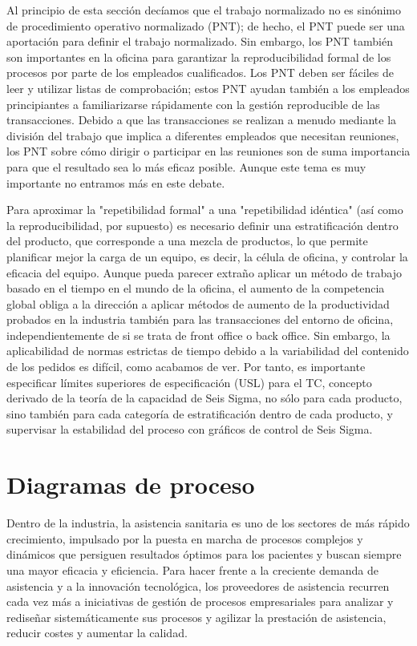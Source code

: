 Al principio de esta sección decíamos que el trabajo normalizado no es sinónimo de procedimiento operativo normalizado (PNT); de hecho, el PNT puede ser una aportación para definir el trabajo normalizado.
Sin embargo, los PNT también son importantes en la oficina para garantizar la reproducibilidad formal de los procesos por parte de los empleados cualificados.
Los PNT deben ser fáciles de leer y utilizar listas de comprobación; estos PNT ayudan también a los empleados principiantes a familiarizarse rápidamente con la gestión reproducible de las transacciones.
Debido a que las transacciones se realizan a menudo mediante la división del trabajo que implica a diferentes empleados que necesitan reuniones, los PNT sobre cómo dirigir o participar en las reuniones son de suma importancia para que el resultado sea lo más eficaz posible.
Aunque este tema es muy importante no entramos más en este debate.

Para aproximar la "repetibilidad formal" a una "repetibilidad idéntica" (así como la reproducibilidad, por supuesto) es necesario definir una estratificación dentro del producto, que corresponde a una mezcla de productos, lo que permite planificar mejor la carga de un equipo, es decir, la célula de oficina, y controlar la eficacia del equipo.
Aunque pueda parecer extraño aplicar un método de trabajo basado en el tiempo en el mundo de la oficina, el aumento de la competencia global obliga a la dirección a aplicar métodos de aumento de la productividad probados en la industria también para las transacciones del entorno de oficina, independientemente de si se trata de front office o back office.
Sin embargo, la aplicabilidad de normas estrictas de tiempo debido a la variabilidad del contenido de los pedidos es difícil, como acabamos de ver.
Por tanto, es importante especificar límites superiores de especificación (USL) para el TC, concepto derivado de la teoría de la capacidad de Seis Sigma, no sólo para cada producto, sino también para cada categoría de estratificación dentro de cada producto, y supervisar la estabilidad del proceso con gráficos de control de Seis Sigma.

\section{Diagramas de proceso}

Dentro de la industria, la asistencia sanitaria es uno de los sectores de más rápido crecimiento, impulsado por la puesta en marcha de procesos complejos y dinámicos que persiguen resultados óptimos para los pacientes y buscan siempre una mayor eficacia y eficiencia.
Para hacer frente a la creciente demanda de asistencia y a la innovación tecnológica, los proveedores de asistencia recurren cada vez más a iniciativas de gestión de procesos empresariales para analizar y rediseñar sistemáticamente sus procesos y agilizar la prestación de asistencia, reducir costes y aumentar la calidad.


